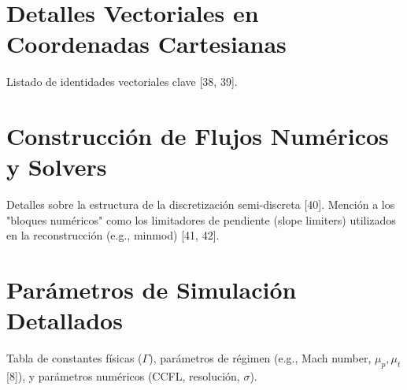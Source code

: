 \section{Detalles Vectoriales en Coordenadas Cartesianas}
    Listado de identidades vectoriales clave [38, 39].

\section{Construcción de Flujos Numéricos y Solvers}
    Detalles sobre la estructura de la discretización semi-discreta [40]. Mención a los "bloques numéricos" como los limitadores de pendiente (slope limiters) utilizados en la reconstrucción (e.g., minmod) [41, 42].

\section{Parámetros de Simulación Detallados}
    Tabla de constantes físicas ($\Gamma$), parámetros de régimen (e.g., Mach number, $\mu_p, \mu_t$ [8]), y parámetros numéricos (CCFL, resolución, $\sigma$).
